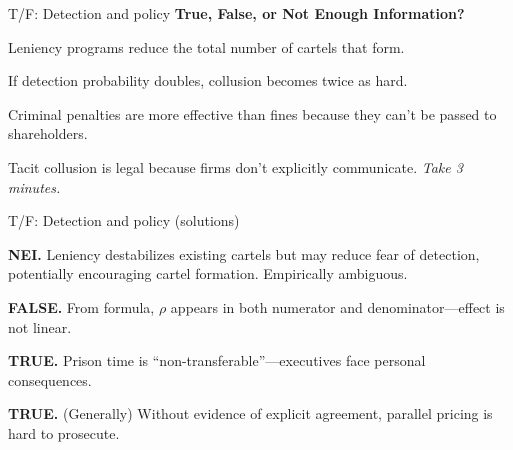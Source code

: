 \documentclass[notes,11pt, aspectratio=169]{beamer}
\newenvironment{wideenumerate}{\enumerate\addtolength{\itemsep}{10pt}}{\endenumerate}
\begin{document}
\begin{frame}{T/F: Detection and policy}
	\textbf{True, False, or Not Enough Information?}
	\vspace{10pt}
	\begin{wideenumerate}
		\item Leniency programs reduce the total number of cartels that form.
		\item If detection probability doubles, collusion becomes twice as hard.
		\item Criminal penalties are more effective than fines because they can't be passed to shareholders.
		\item Tacit collusion is legal because firms don't explicitly communicate.
	\end{wideenumerate}
	\vspace{10pt}
	\centering
	\textit{Take 3 minutes.}
\end{frame}

\begin{frame}{T/F: Detection and policy (solutions)}
	\begin{wideenumerate}
		\item \textbf{NEI.} Leniency destabilizes existing cartels but may reduce fear of detection, potentially encouraging cartel formation. Empirically ambiguous.
		\item \textbf{FALSE.} From formula, $\rho$ appears in both numerator and denominator---effect is not linear.
		\item \textbf{TRUE.} Prison time is ``non-transferable''---executives face personal consequences.
		\item \textbf{TRUE.} (Generally) Without evidence of explicit agreement, parallel pricing is hard to prosecute.
	\end{wideenumerate}
\end{frame}
\end{document}
